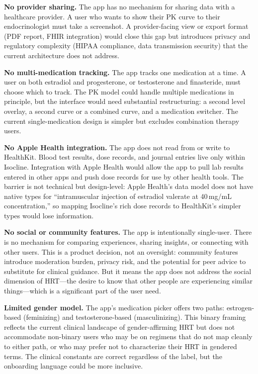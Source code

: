 \documentclass[11pt,a4paper]{article}
\begin{document}
\textbf{No provider sharing.} The app has no mechanism for sharing data
with a healthcare provider. A user who wants to show their PK curve to
their endocrinologist must take a screenshot. A provider-facing view or
export format (PDF report, FHIR integration) would close this gap but
introduces privacy and regulatory complexity (HIPAA compliance, data
transmission security) that the current architecture does not address.

\textbf{No multi-medication tracking.} The app tracks one medication at a
time. A user on both estradiol and progesterone, or testosterone and
finasteride, must choose which to track. The PK model could handle
multiple medications in principle, but the interface would need
substantial restructuring: a second level overlay, a second curve or a
combined curve, and a medication switcher. The current single-medication
design is simpler but excludes combination therapy users.

\textbf{No Apple Health integration.} The app does not read from or write
to HealthKit. Blood test results, dose records, and journal entries live
only within Isocline. Integration with Apple Health would allow the app to
pull lab results entered in other apps and push dose records for use by
other health tools. The barrier is not technical but design-level: Apple
Health's data model does not have native types for ``intramuscular
injection of estradiol valerate at 40\,mg/mL concentration,'' so mapping
Isocline's rich dose records to HealthKit's simpler types would lose
information.

\textbf{No social or community features.} The app is intentionally
single-user. There is no mechanism for comparing experiences, sharing
insights, or connecting with other users. This is a product decision, not
an oversight: community features introduce moderation burden, privacy
risk, and the potential for peer advice to substitute for clinical
guidance. But it means the app does not address the social dimension of
HRT---the desire to know that other people are experiencing similar
things---which is a significant part of the user need.

\textbf{Limited gender model.} The app's medication picker offers two
paths: estrogen-based (feminizing) and testosterone-based
(masculinizing). This binary framing reflects the current clinical
landscape of gender-affirming HRT but does not accommodate non-binary
users who may be on regimens that do not map cleanly to either path, or
who may prefer not to characterize their HRT in gendered terms. The
clinical constants are correct regardless of the label, but the
onboarding language could be more inclusive.
\end{document}
